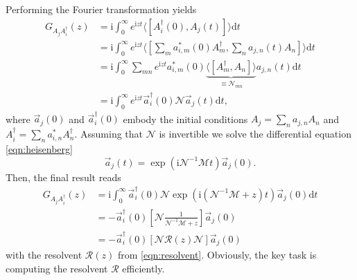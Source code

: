 \documentclass[
    reprint, 
    aps,
    preprintnumbers,
    twocolumn,
    prb,
    superscriptaddress
]{revtex4-2}
\newcommand{\im}{\mathrm{i}}
\newcommand{\mM}{\mathcal{M}}
\newcommand{\mN}{\mathcal{N}}
\newcommand{\bs}{\begin{subequations}}
\newcommand{\es}{\end{subequations}}
\begin{document}
Performing the  Fourier transformation yields
\bs
\begin{align}
    G_{A_j A_i^\dagger} (z) &= \im \int_0^\infty e^{\im z t} \langle [ A_i^\dagger(0), A_j(t) ] \rangle \mathrm{d}t \
		\\
        &= \im \int_0^\infty e^{\im z t} 
				\langle [ \sum_m a_{i,m}^*(0) A_m^\dagger, \sum_n a_{j,n}(t) A_n ] \rangle \mathrm{d}t 
		\\
        &= \im \int_0^\infty \sum_{mn} e^{\im z t} a_{i,m}^*(0) \underbrace{\langle [ A_m^\dagger, A_n ] \rangle}_{\equiv \mN_{mn}} a_{j,n}(t) \mathrm{d}t 
    \\
        &= \im \int_0^\infty e^{\im z t} \vec{a}_{i}^\dagger (0) \mN \vec{a}_{j}(t) \mathrm{d}t,
\end{align}
\es
where $\vec{a}_j(0)$ and $\vec{a}_i^\dagger (0)$ embody the initial conditions $A_j = \sum_n a_{j,n} A_n$ 
and $A_i^\dagger = \sum_n a_{i,n}^* A_n^\dagger$.
Assuming that $\mN$ is invertible we solve the differential equation \eqref{eqn:heisenberg} 
\begin{equation}
    \vec{a}_{j}(t) = \exp \left( \im \mN^{-1} \mM t \right) \vec{a}_{j}(0).
\end{equation}
Then, the final result reads
\bs
\begin{align}
    \label{eqn:green_derivation}
    G_{A_j A_i^\dagger} (z) &= \im  \int_0^\infty \vec{a}_{i}^\dagger (0) \mN 
		\exp \left( \im \left(\mN^{-1} \mM + z \right) t \right) \vec{a}_{j}(0) \mathrm{d}t 
		\\
        &= - \vec{a}_{i}^\dagger (0) \left[ \mN \frac{1}{\mN^{-1} \mM + z} \right] \vec{a}_{j}(0) 
				\\
        &= - \vec{a}_{i}^\dagger (0) \left[ 
				\mN \mathcal{R}(z) \mN \right] \vec{a}_{j}(0)
\end{align}
\es
with the resolvent $\mathcal{R}(z)$ from \eqref{eqn:resolvent}.
Obviously, the key task is computing the resolvent $\mathcal{R}$ efficiently.
\end{document}
